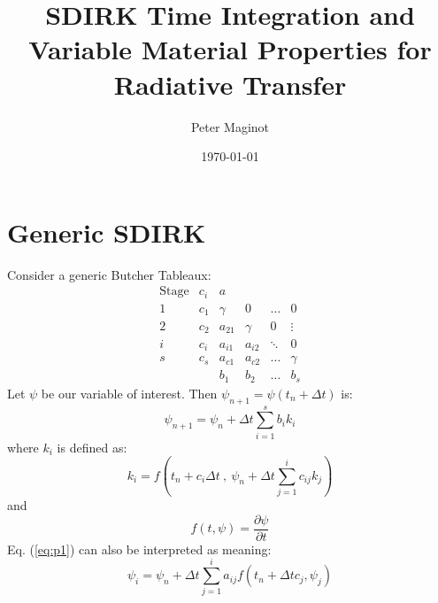 \documentclass[11pt]{article}
\newcommand{\benum}{\begin{equation}}
\newcommand{\eenum}{\end{equation}}
\newcommand{\be}{\begin{equation*}}
\newcommand{\ee}{\end{equation*}}
\newcommand{\eqt}[1]{Eq. (\ref{#1})}
\newcommand{\p}{\ensuremath{ \partial}}
\begin{document}
\author{Peter Maginot}
\date{\today}
\title{SDIRK Time Integration and Variable Material Properties for Radiative Transfer}
\maketitle
\section{Generic SDIRK}
Consider a generic Butcher Tableaux:
\be
\begin{array}{c|c|cccc}
\text{Stage}& c_i 	 & a  			&  		&					&	\\
\hline
1						&  c_1   &  \gamma 	&  0  	&		\dots		&  0 \\
2						&  c_2   &  a_{21}  & \gamma  & 		0		& \vdots	\\	
i						& c_i    &   a_{i1} &  a_{i2} & \ddots   &	0	\\
s      			&  c_s   &   a_{c1} & a_{c2} 	& \dots 		& \gamma \\
\hline
{}					&				&		b_1		&		b_2			& \dots 	&   b_s
\end{array}
\ee
Let $\psi$ be our variable of interest.  Then $\psi_{n+1}=\psi(t_n + \Delta t)$ is:
\benum
\psi_{n+1} = \psi_n + \Delta t \sum_{i=1}^s{b_i k_i}
\label{eq:p1}
\eenum
where $k_i$ is defined as:
\be
k_i = f\left( t_n + c_i \Delta t ~,~\psi_{n} + \Delta t \sum_{j=1}^i{c_{ij} k_j }\right)
\ee
and
\be
f(t,\psi) = \frac{\p \psi}{\p t}
\ee
\eqt{eq:p1} can also be interpreted as meaning:
\benum
\psi_i = \psi_{n} + \Delta t \sum_{j=1}^i{a_{ij} f\left(t_n + \Delta t c_j , \psi_j\right)}
\label{eq:psi-def}
\eenum
\end{document}
